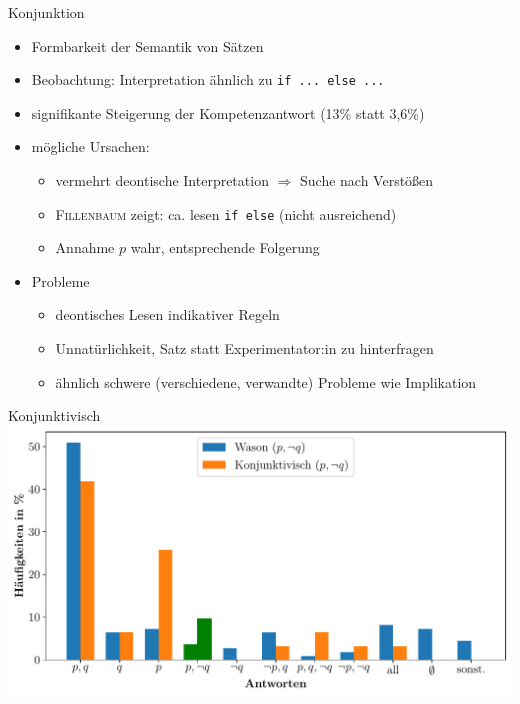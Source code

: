 \begin{frame}{Konjunktion {\scriptsize \cite[S.~107-109]{stenningHumanReasoningCognitive2008}}}
    \begin{itemize}
        \item Formbarkeit der Semantik von Sätzen
        \item Beobachtung: Interpretation ähnlich zu \texttt{if ... else ...}
        \item signifikante Steigerung der Kompetenzantwort {\small (13\% statt 3,6\%)}
        
        \pause
        \item mögliche Ursachen:
        \begin{itemize}
            \item vermehrt deontische Interpretation $\Rightarrow$ Suche nach Verstößen
            \item \textsc{Fillenbaum} zeigt: ca.  lesen \texttt{if else} {\small (nicht ausreichend)}
            \item Annahme $p$ wahr, entsprechende Folgerung
        \end{itemize}
        
        \pause
        \item Probleme
        \begin{itemize}
            \item deontisches Lesen indikativer Regeln
            \item Unnatürlichkeit, Satz statt Experimentator:in zu hinterfragen
            \item ähnlich schwere (verschiedene, verwandte) Probleme wie Implikation
        \end{itemize}
    \end{itemize}
\end{frame}


\begin{frame}{Konjunktivisch {\scriptsize \cite[S.~109]{stenningHumanReasoningCognitive2008}}}
    \includegraphics[width=\textwidth]{../plot/results_subjunctive.pdf}
\end{frame}


